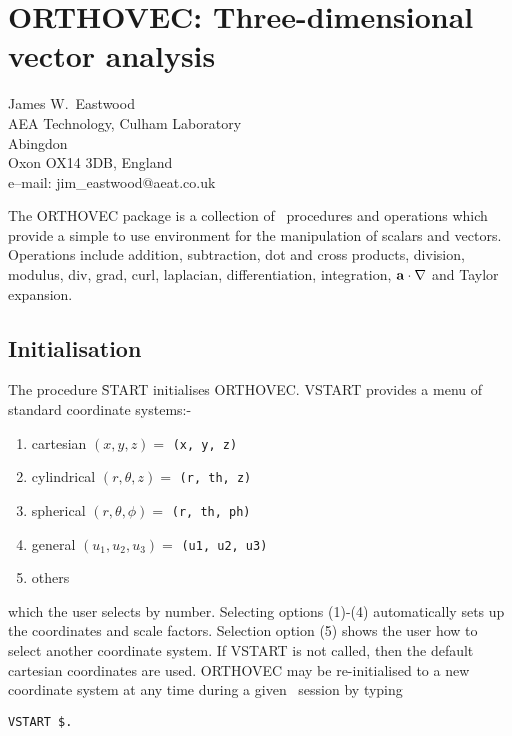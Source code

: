 \chapter[ORTHOVEC: scalars and vectors]%
	{ORTHOVEC: Three-dimensional vector analysis}
\label{ORTHOVEC}

{\footnotesize
\begin{center}
James W.~Eastwood \\
AEA Technology, Culham Laboratory \\
Abingdon \\
Oxon OX14 3DB, England \\[0.05in]
e--mail: jim\_eastwood@aeat.co.uk
\end{center}
}

The ORTHOVEC package is a collection of \REDUCE\ procedures and
operations which provide a simple to use environment for the
manipulation of scalars and vectors.  Operations include addition,
subtraction, dot and cross products, division, modulus, div, grad,
curl, laplacian, differentiation, integration, ${\bf a \cdot \nabla}$
and Taylor expansion.

\section{Initialisation}\label{vstart}
The procedure \f{START} initialises ORTHOVEC. VSTART provides a
menu of standard coordinate systems:-

\begin{enumerate}
\item cartesian $(x, y, z) = $ {\tt (x, y, z)}
\item cylindrical $(r, \theta, z) = $ {\tt (r, th, z)}
\item spherical $(r, \theta, \phi) = $ {\tt (r, th, ph) }
\item general $( u_1, u_2, u_3 ) = $ {\tt (u1, u2, u3) }
\item others
\end{enumerate}

which the user selects by number.  Selecting options (1)-(4)
automatically sets up the coordinates and scale factors.  Selection
option (5) shows the user how to select another coordinate system.  If
VSTART is not called, then the default cartesian coordinates are used.
ORTHOVEC may be re-initialised to a new coordinate system at any time
during a given \REDUCE\ session by typing
\begin{verbatim}
VSTART $.
\end{verbatim}


